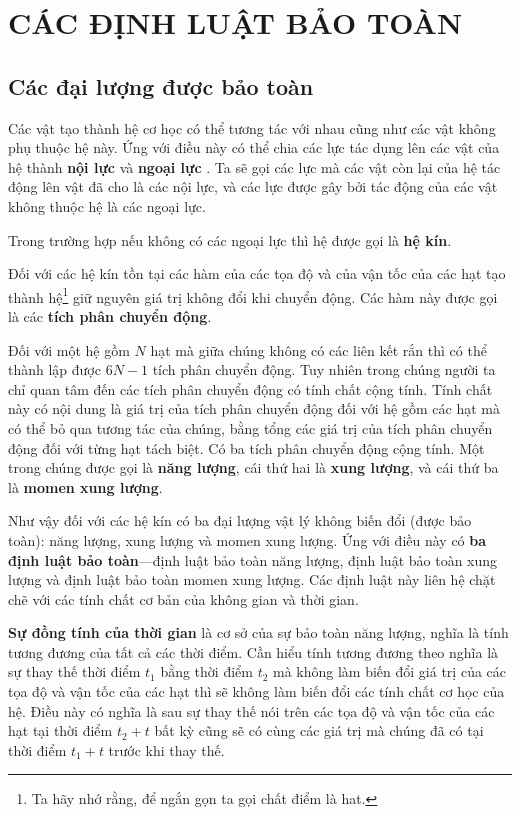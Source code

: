 

\chapter{CÁC ĐỊNH LUẬT BẢO TOÀN}\label{chap:3}

\section{Các đại lượng được bảo toàn}\label{sec:3_1}

Các vật tạo thành hệ cơ học có thể tương tác với nhau cũng như các vật không phụ thuộc hệ này. Ứng với điều này có thể chia các lực tác dụng lên các vật của hệ thành \textbf{nội lực} và \textbf{ngoại lực} . Ta sẽ gọi các lực mà các vật còn lại của hệ tác động lên vật đã cho là các nội lực, và các lực được gây bởi tác động của các vật không thuộc hệ là các ngoại lực.

Trong trường hợp nếu không có các ngoại lực thì hệ được gọi là \textbf{hệ kín}.

Đối với các hệ kín tồn tại các hàm của các tọa độ và của vận tốc của các hạt tạo thành hệ\footnote{Ta hãy nhớ rằng, để ngắn gọn ta gọi chất điểm là hat.} giữ nguyên giá trị không đổi khi chuyển động. Các hàm này được gọi là các \textbf{tích phân chuyển động}.

Đối với một hệ gồm $N$ hạt mà giữa chúng không có các liên kết rắn thì có thể thành lập được $6N-1$ tích phân chuyển động. Tuy nhiên trong chúng người ta chỉ quan tâm đến các tích phân chuyển động có tính chất cộng tính. Tính chất này có nội dung là giá trị của tích phân chuyển động đối với hệ gồm các hạt mà có thể bỏ qua tương tác của chúng, bằng tổng các giá trị của tích phân chuyển động đối với từng hạt tách biệt. Có ba tích phân chuyển động cộng tính. Một trong chúng được gọi là \textbf{năng lượng}, cái thứ hai là \textbf{xung lượng}, và cái thứ ba là \textbf{momen xung lượng}.

Như vậy đối với các hệ kín có ba đại lượng vật lý không biến đổi (được bảo toàn): năng lượng, xung lượng và momen xung lượng. Ứng với điều này có \textbf{ba định luật bảo toàn}---định luật bảo toàn năng lượng, định luật bảo toàn xung lượng và định luật bảo toàn momen xung lượng. Các định luật này liên hệ chặt chẽ với các tính chất cơ bản của không gian và thời gian.

\textbf{Sự đồng tính của thời gian} là cơ sở của sự bảo toàn năng lượng, nghĩa là tính tương đương của tất cả các thời điểm. Cần hiểu tính tương đương theo nghĩa là sự thay thế thời điểm $t_1$ bằng thời điểm $t_2$ mà không làm biến đổi giá trị của các tọa độ và vận tốc của các hạt thì sẽ không làm biến đổi các tính chất cơ học của hệ. Điều này có nghĩa là sau sự thay thế nói trên các tọa độ và vận tốc của các hạt tại thời điểm $t_2+t$ bất kỳ cũng sẽ có cùng các giá trị mà chúng đã có tại thời điểm $t_1+t$ trước khi thay thế.

